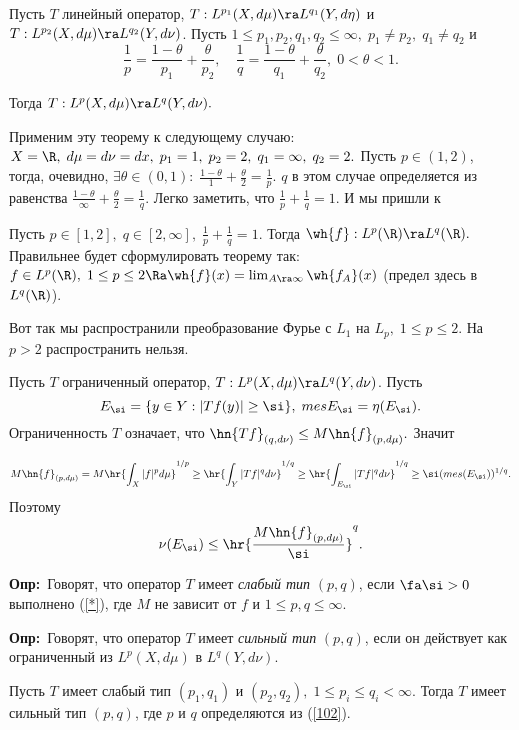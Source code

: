 \documentclass[a4paper]{article}
\def\defin{\noindent\textbf{Опр:}\ }
\begin{document}
\begin{theorems} Пусть $T$ линейный оператор, $T:L^{p_1}(X,d\mu)\ra
L^{q_1}(Y,d\eta)$ и $T:L^{p_2}(X,d\mu)\ra L^{q_2}(Y,d\nu)$. Пусть $1\le
p_1,p_2,q_1,q_2\le\infty,\;p_1\neq p_2,\;q_1\neq q_2$ и
\begin{equation}\label{102}
\frac1p=\frac{1-\theta}{p_1}+\frac{\theta}{p_2},\quad
\frac1q=\frac{1-\theta}{q_1}+\frac{\theta}{q_2},\;0<\theta<1.
\end{equation}

Тогда $T:L^{p}(X,d\mu)\ra L^{q}(Y,d\nu).$
\end{theorems}

Применим эту теорему к следующему случаю: $X=\R ,\;d\mu=d\nu=dx,\;p_1=1,\;p_2=2,\;q_1=\infty,\;q_2=2.$
Пусть $p\in(1,2)$, тогда, очевидно, $\exi\theta\in(0,1):\;\frac{1-\theta}1+\frac{\theta}2=\frac1p.$ $q$ в
этом случае определяется из равенства $\frac{1-\theta}{\infty}+\frac{\theta}2=\frac1q.$ Легко заметить, что
$\frac1p+\frac1q=1.$ И мы пришли к
\begin{theorems}
Пусть $p\in[1,2],\;q\in[2,\infty],\;\frac1p+\frac1q=1$. Тогда $\wh{f}:L^p(\R )\ra
L^q(\R ).$ Правильнее будет сформулировать теорему так: $f\in L^p(\R ),\;1\le
p\le2\Ra \wh{f}(x)=\lim_{A\ra\infty} \wh{f_A}(x)$ (предел здесь в
$L^q(\R )$).
\end{theorems}

Вот так мы распространили преобразование Фурье с $L_1$ на $L_p,\;1\le p \le 2$. На $p>2$ распространить
нельзя.

Пусть $T$ ограниченный оператор, $T:L^p(X,d\mu)\ra L^q(Y,d\nu)$. Пусть
$$E_{\si}=\{y\in Y:|Tf(y)|\ge\si\},\;mes E_{\si}=\eta(E_{\si}).$$ Ограниченность $T$ означает, что
$\hn{Tf}_{(q,d\nu)}\le M\hn{f}_{(p,d\mu)}.$ Значит

$$M\hn{f}_{(p,d\mu)}=M\hr{\int_X |f|^pd\mu}^{1/p}\ge \hr{\int_Y |Tf|^qd\nu}^{1/q}\ge
\hr{\int_{E_{\si}} |Tf|^qd\nu}^{1/q}\ge\si(mes(E_{\si}))^{1/q}.$$ Поэтому
\begin{equation}\label{*}
\nu(E_{\si})\le\hr{\frac{M\hn{f}_{(p,d\mu)}}{\si}}^q.
\end{equation}

\defin Говорят, что оператор $T$ имеет \emph{слабый тип} $(p,q)$, если $\fa\si>0$
выполнено (\ref{*}), где $M$ не зависит от $f$ и $1\le p,q\le\infty.$

\defin Говорят, что оператор $T$ имеет \emph{сильный тип} $(p,q)$, если он действует как
ограниченный из $L^p(X,d\mu)$ в $L^q(Y,d\nu).$

\begin{theorems}[Марцинкевич] Пусть $T$ имеет слабый тип
$(p_1,q_1)$ и $(p_2,q_2),\;1\le p_i\le q_i<\infty$. Тогда $T$ имеет сильный тип $(p,q)$, где $p$ и $q$
определяются из (\ref{102}).
\end{theorems}
\end{document}
